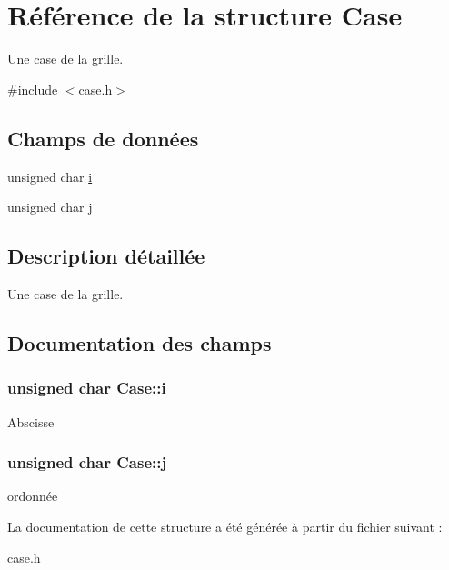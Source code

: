 \hypertarget{structCase}{
\section{Référence de la structure Case}
\label{structCase}
}


Une case de la grille.  




{\ttfamily \#include $<$case.h$>$}

\subsection*{Champs de données}
\begin{DoxyCompactItemize}
\item 
unsigned char \hyperlink{structCase_aa153db46def2bd44f5e438a0f5695779}{i}
\item 
unsigned char \hyperlink{structCase_aa29567a6d5b6753ecf7cff4567a77e1e}{j}
\end{DoxyCompactItemize}


\subsection{Description détaillée}
Une case de la grille. 

\subsection{Documentation des champs}
\hypertarget{structCase_aa153db46def2bd44f5e438a0f5695779}{
\subsubsection[{i}]{\setlength{\rightskip}{0pt plus 5cm}unsigned char {\bf Case::i}}}
\label{structCase_aa153db46def2bd44f5e438a0f5695779}
Abscisse \hypertarget{structCase_aa29567a6d5b6753ecf7cff4567a77e1e}{
\subsubsection[{j}]{\setlength{\rightskip}{0pt plus 5cm}unsigned char {\bf Case::j}}}
\label{structCase_aa29567a6d5b6753ecf7cff4567a77e1e}
ordonnée 

La documentation de cette structure a été générée à partir du fichier suivant :\begin{DoxyCompactItemize}
\item 
case.h\end{DoxyCompactItemize}
